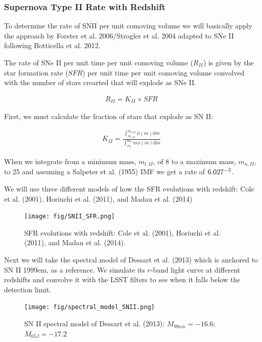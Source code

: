 \documentclass[12pt, twocolumn]{emulateapj}
\begin{document}
\begin{appendix}
\subsubsection{Supernova Type II Rate with Redshift}
\label{sec:TypeIIRate}

To determine the rate of SNII per unit comoving volume we will basically apply the approach by Forster et al. 2006/Strogler et al. 2004 adapted to SNe II following Botticella et al. 2012.

The rate of SNe II per unit time per unit comoving volume ($R_{II}$) is given by the star formation rate ($SFR$) per unit time per unit comoving volume convolved with the number of stars crearted that will explode as SNe II.

\begin{align}
	\label{eq:rateII_1}
	R_{II} = K_{II} \times SFR
\end{align}

First, we must calculate the fraction of stars that explode as SN II:

\begin{align}
\label{eq:rateII_2}
K_{II} = \frac{\int_{m_{l,II}}^{m_{u,II}} \phi(m) \mathrm{d}m}{\int_{m_{l}}^{m_{u}} m\phi(m) \mathrm{d}m}
\end{align}

When we integrate from a minimum mass, $m_{l,II}$, of 8 to a maximum mass, $m_{u,II}$, to 25 and assuming a Salpeter et al. (1955) IMF we get a rate of $6.027 \time 10^{-3}$.

We will use three different models of how the SFR evolutions with redshift: Cole et al. (2001), Horiuchi et al. (2011), and Madau et al. (2014)

\begin{figure}
	\begin{center}
		\texttt{[image: fig/SNII\_SFR.png]}
		\caption{SFR evolutions with redshift: Cole et al. (2001), Horiuchi et al. (2011), and Madau et al. (2014).}
		\label{fig:SNII_SFR}
	\end{center}
\end{figure}

Next we will take the spectral model of Dessart et al. (2013) which is anchored to SN II 1999em, as a reference. 
We simulate its $r$-band light curve at different redshifts and convolve it with the LSST filters to see when it falls below the detection limit.

\begin{figure}
	\begin{center}
		\texttt{[image: fig/spectral\_model\_SNII.png]}
		\caption{SN II spectral model of Dessart et al. (2013): $M_{99em}=-16.6$; $M_{05J}=-17.2$}
		\label{fig:SNII_lc}
	\end{center}
\end{figure}


\end{appendix}
\end{document}

